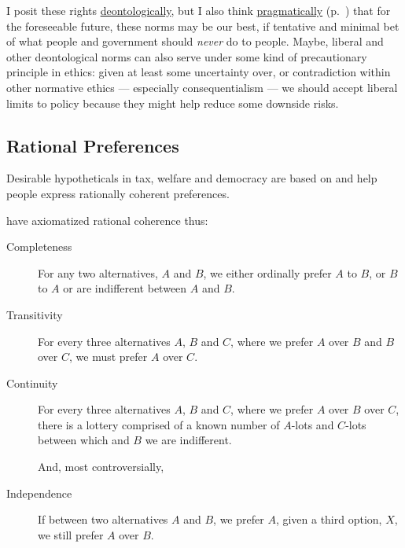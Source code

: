 I posit these rights \hyperref[sec:deontological]{deontologically}, but I also think \hyperref[itm:pragmatic-ethics]{pragmatically} (p.~\pageref{itm:pragmatic-ethics}) that for the foreseeable future, these norms may be our best, if tentative and minimal bet of what people and government should \emph{never} do to people. 
Maybe, liberal and other deontological norms can also serve under some kind of precautionary principle in ethics: given at least some uncertainty over, or contradiction within other normative ethics --- especially consequentialism --- we should accept liberal limits to policy because they might help reduce some downside risks.

\subsection[Rational]{Rational Preferences} \label{sec:rational} %
Desirable hypotheticals in tax, welfare and democracy are based on and help people express rationally coherent preferences.

\cite{VonNeumannMorgenstern1944} have axiomatized rational coherence thus:
\begin{description}
	\item[Completeness  \label{itm:completeness}] For any two alternatives, $A$ and $B$, we either ordinally prefer $A$ to $B$, or $B$ to $A$ or are indifferent between $A$ and $B$.
	\item[Transitivity  \label{itm:transitivity}] For every three alternatives $A$, $B$ and $C$, where we prefer $A$ over $B$ and $B$ over $C$, we must prefer $A$ over $C$.
	\item[Continuity  \label{itm:continuity}] For every three alternatives	$A$, $B$ and $C$, where we prefer $A$ over $B$ over $C$, there is a lottery comprised of a known number of $A$-lots and $C$-lots between which and $B$ we are indifferent.
		
	And, most controversially,
		
	\item[Independence  \label{itm:independence}] If between two alternatives $A$ and $B$, we prefer $A$, given a third option, $X$, we still prefer $A$ over $B$.	
\end{description}

